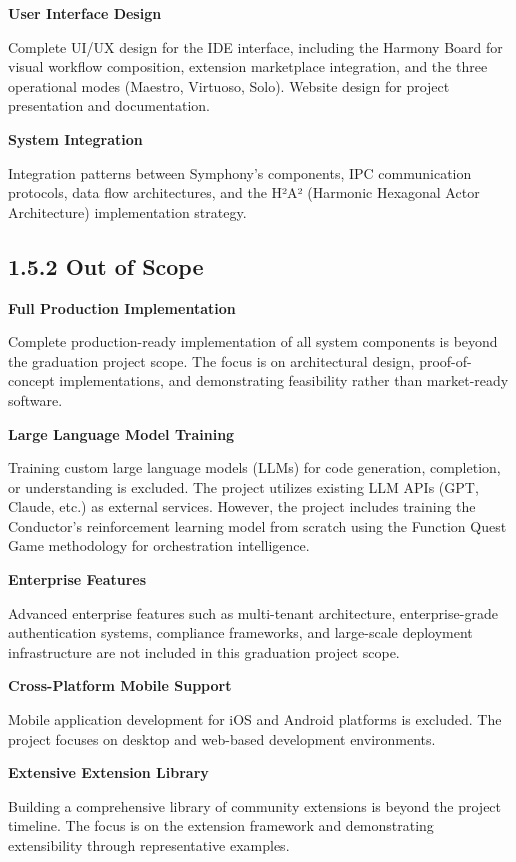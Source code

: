 \textbf{User Interface Design}

Complete UI/UX design for the IDE interface, including the Harmony Board for visual workflow composition, extension marketplace integration, and the three operational modes (Maestro, Virtuoso, Solo). Website design for project presentation and documentation.

\textbf{System Integration}

Integration patterns between Symphony's components, IPC communication protocols, data flow architectures, and the H²A² (Harmonic Hexagonal Actor Architecture) implementation strategy.

\subsection*{1.5.2 Out of Scope}

\textbf{Full Production Implementation}

Complete production-ready implementation of all system components is beyond the graduation project scope. The focus is on architectural design, proof-of-concept implementations, and demonstrating feasibility rather than market-ready software.

\textbf{Large Language Model Training}

Training custom large language models (LLMs) for code generation, completion, or understanding is excluded. The project utilizes existing LLM APIs (GPT, Claude, etc.) as external services. However, the project includes training the Conductor's reinforcement learning model from scratch using the Function Quest Game methodology for orchestration intelligence.


\textbf{Enterprise Features}

Advanced enterprise features such as multi-tenant architecture, enterprise-grade authentication systems, compliance frameworks, and large-scale deployment infrastructure are not included in this graduation project scope.

\textbf{Cross-Platform Mobile Support}

Mobile application development for iOS and Android platforms is excluded. The project focuses on desktop and web-based development environments.

\textbf{Extensive Extension Library}

Building a comprehensive library of community extensions is beyond the project timeline. The focus is on the extension framework and demonstrating extensibility through representative examples.


